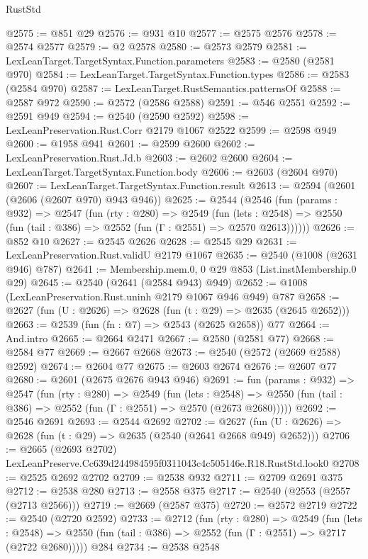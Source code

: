 \begin{lexlean}{RustStd}
\begin{coremodule}
@2575 := @851 @29
@2576 := @931 @10
@2577 := @2575 @2576
@2578 := @2574 @2577
@2579 := @2 @2578
@2580 := @2573 @2579
@2581 := LexLeanTarget.TargetSyntax.Function.parameters
@2583 := @2580 (@2581 @970)
@2584 := LexLeanTarget.TargetSyntax.Function.types
@2586 := @2583 (@2584 @970)
@2587 := LexLeanTarget.RustSemantics.patternsOf
@2588 := @2587 @972
@2590 := @2572 (@2586 @2588)
@2591 := @546 @2551
@2592 := @2591 @949
@2594 := @2540 (@2590 @2592)
@2598 := LexLeanPreservation.Rust.Corr @2179 @1067 @2522
@2599 := @2598 @949
@2600 := @1958 @941
@2601 := @2599 @2600
@2602 := LexLeanPreservation.Rust.Jd.b
@2603 := @2602 @2600
@2604 := LexLeanTarget.TargetSyntax.Function.body
@2606 := @2603 (@2604 @970)
@2607 := LexLeanTarget.TargetSyntax.Function.result
@2613 := @2594 (@2601 (@2606 (@2607 @970) @943 @946))
@2625 := @2544
    (@2546
      (fun (params : @932) =>
      @2547
        (fun (rty : @280) =>
        @2549
          (fun (lets : @2548) =>
          @2550 (fun (tail : @386) => @2552 (fun (Γ : @2551) => @2570 @2613))))))
@2626 := @852 @10
@2627 := @2545 @2626
@2628 := @2545 @29
@2631 := LexLeanPreservation.Rust.validU @2179 @1067
@2635 := @2540 (@1008 (@2631 @946) @787)
@2641 := Membership.mem.{0, 0} @29 @853 (List.instMembership.{0} @29)
@2645 := @2540 (@2641 (@2584 @943) @949)
@2652 := @1008 (LexLeanPreservation.Rust.uninh @2179 @1067 @946 @949) @787
@2658 := @2627 (fun (U : @2626) => @2628 (fun (t : @29) => @2635 (@2645 @2652)))
@2663 := @2539 (fun (fn : @7) => @2543 (@2625 @2658)) @77
@2664 := And.intro
@2665 := @2664 @2471
@2667 := @2580 (@2581 @77)
@2668 := @2584 @77
@2669 := @2667 @2668
@2673 := @2540 (@2572 (@2669 @2588) @2592)
@2674 := @2604 @77
@2675 := @2603 @2674
@2676 := @2607 @77
@2680 := @2601 (@2675 @2676 @943 @946)
@2691 := fun (params : @932) =>
  @2547
    (fun (rty : @280) =>
    @2549
      (fun (lets : @2548) =>
      @2550 (fun (tail : @386) => @2552 (fun (Γ : @2551) => @2570 (@2673 @2680)))))
@2692 := @2546 @2691
@2693 := @2544 @2692
@2702 := @2627 (fun (U : @2626) => @2628 (fun (t : @29) => @2635 (@2540 (@2641 @2668 @949) @2652)))
@2706 := @2665 (@2693 @2702) LexLeanPreserve.Cc639d244984595f0311043c4c505146e.R18.RustStd.look0
@2708 := @2525 @2692 @2702
@2709 := @2538 @932
@2711 := @2709 @2691 @375
@2712 := @2538 @280
@2713 := @2558 @375
@2717 := @2540 (@2553 (@2557 (@2713 @2566)))
@2719 := @2669 (@2587 @375)
@2720 := @2572 @2719
@2722 := @2540 (@2720 @2592)
@2733 := @2712
    (fun (rty : @280) =>
    @2549
      (fun (lets : @2548) =>
      @2550 (fun (tail : @386) => @2552 (fun (Γ : @2551) => @2717 (@2722 @2680)))))
    @284
@2734 := @2538 @2548

\end{coremodule}
\end{lexlean}
